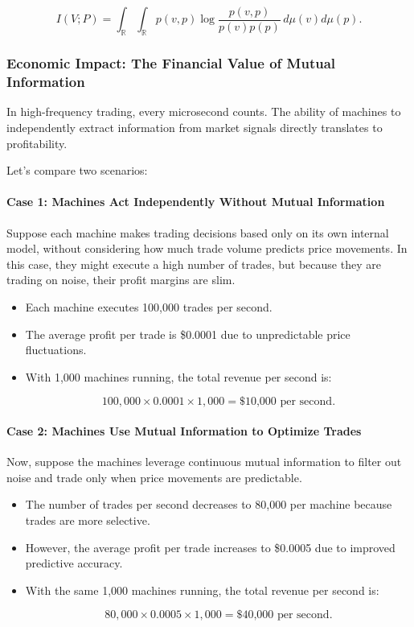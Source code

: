 \[
I(V; P) = \int_{\mathbb{R}} \int_{\mathbb{R}} p(v, p) \log \frac{p(v, p)}{p(v) p(p)} \, d\mu(v) d\mu(p).
\]

\subsubsection*{Economic Impact: The Financial Value of Mutual Information}

In high-frequency trading, every microsecond counts. The ability of machines to independently extract information from market signals directly translates to profitability.

Let’s compare two scenarios:

\paragraph{Case 1: Machines Act Independently Without Mutual Information}

Suppose each machine makes trading decisions based only on its own internal model, without considering how much trade volume predicts price movements. In this case, they might execute a high number of trades, but because they are trading on noise, their profit margins are slim.

\begin{itemize}
    \item Each machine executes 100,000 trades per second.
    \item The average profit per trade is \$0.0001 due to unpredictable price fluctuations.
    \item With 1,000 machines running, the total revenue per second is:

    \[
    100,000 \times 0.0001 \times 1,000 = \text{\$10,000 per second}.
    \]

\end{itemize}

\paragraph{Case 2: Machines Use Mutual Information to Optimize Trades}

Now, suppose the machines leverage continuous mutual information to filter out noise and trade only when price movements are predictable.

\begin{itemize}
    \item The number of trades per second decreases to 80,000 per machine because trades are more selective.
    \item However, the average profit per trade increases to \$0.0005 due to improved predictive accuracy.
    \item With the same 1,000 machines running, the total revenue per second is:

    \[
    80,000 \times 0.0005 \times 1,000 = \text{\$40,000 per second}.
    \]

\end{itemize}

